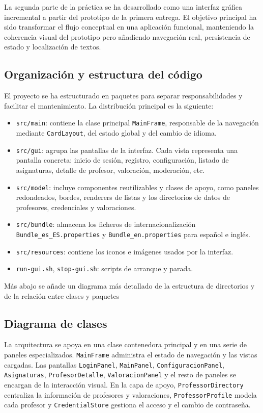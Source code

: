 \documentclass[12pt,oneside]{book}
\begin{document}
La segunda parte de la práctica se ha desarrollado como una interfaz gráfica incremental a partir del prototipo de la primera entrega. El objetivo principal ha sido transformar el flujo conceptual en una aplicación funcional, manteniendo la coherencia visual del prototipo pero añadiendo navegación real, persistencia de estado y localización de textos.

\subsection{Organización y estructura del código}

El proyecto se ha estructurado en paquetes para separar responsabilidades y facilitar el mantenimiento. La distribución principal es la siguiente:

\begin{itemize}
    \item \texttt{src/main}: contiene la clase principal \texttt{MainFrame}, responsable de la navegación mediante \texttt{CardLayout}, del estado global y del cambio de idioma.
    \item \texttt{src/gui}: agrupa las pantallas de la interfaz. Cada vista representa una pantalla concreta: inicio de sesión, registro, configuración, listado de asignaturas, detalle de profesor, valoración, moderación, etc.
    \item \texttt{src/model}: incluye componentes reutilizables y clases de apoyo, como paneles redondeados, bordes, renderers de listas y los directorios de datos de profesores, credenciales y valoraciones.
    \item \texttt{src/bundle}: almacena los ficheros de internacionalización \texttt{Bundle\_es\_ES.properties} y \texttt{Bundle\_en.properties} para español e inglés.
    \item \texttt{src/resources}: contiene los iconos e imágenes usados por la interfaz.
    \item \texttt{run-gui.sh}, \texttt{stop-gui.sh}: scripts de arranque y parada.
\end{itemize}

Más abajo se añade un diagrama más detallado de la estructura de directorios y de la relación entre clases y paquetes

\subsection{Diagrama de clases}

La arquitectura se apoya en una clase contenedora principal y en una serie de paneles especializados. \texttt{MainFrame} administra el estado de navegación y las vistas cargadas. Las pantallas \texttt{LoginPanel}, \texttt{MainPanel}, \texttt{ConfiguracionPanel}, \texttt{Asignaturas}, \texttt{ProfesorDetalle}, \texttt{ValoracionPanel} y el resto de paneles se encargan de la interacción visual. En la capa de apoyo, \texttt{ProfessorDirectory} centraliza la información de profesores y valoraciones, \texttt{ProfessorProfile} modela cada profesor y \texttt{CredentialStore} gestiona el acceso y el cambio de contraseña.
\end{document}
